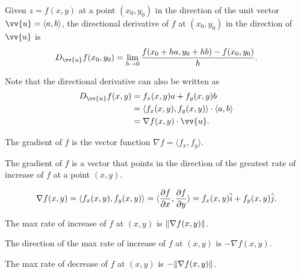 \documentclass{article}
\begin{document}
\renewcommand{\familydefault}{\rmdefault}



\setcounter{page}{0}
\newpage
\tableofcontents
\newpage



\begin{definitionbox}
    Given \( z = f(x, y) \) at a point \( (x_0, y_0) \) in the direction of the unit vector \( \vv{u} = \langle a, b \rangle \), the directional derivative of \( f \) at \( (x_0, y_0) \) in the direction of \( \vv{u} \) is
    \[ D_{\vv{u}} f(x_0, y_0) = \lim_{h \to 0} \frac{f(x_0 + ha, y_0 + hb) - f(x_0, y_0)}{h}. \]
\end{definitionbox}

\begin{notebox}
    Note that the directional derivative can also be written as
    \begin{align*}
        D_{\vv{u}} f(x, y) &= f_x(x, y) a + f_y(x, y) b \\
        &= \langle f_x(x, y), f_y(x, y) \rangle \cdot \langle a, b \rangle \\
        &= \nabla f(x, y) \cdot \vv{u}.
    \end{align*}
\end{notebox}

\begin{definitionbox}
    The gradient of \( f \) is the vector function \( \nabla f = \langle f_x, f_y \rangle \).

    \begin{conceptbox}
        The gradient of \( f \) is a vector that points in the direction of the greatest rate of increase of \( f \) at a point \( (x, y) \).

        \[ \nabla f(x, y) = \langle f_x(x, y), f_y(x, y) \rangle = \langle \pdv{f}{x}, \pdv{f}{y} \rangle = f_x(x, y) \hat{i} + f_y(x, y) \hat{j}. \]
    \end{conceptbox}
\end{definitionbox}

The max rate of increase of \( f \) at \( (x, y) \) is \( \norm{\nabla f(x, y)} \).

The direction of the max rate of increase of \( f \) at \( (x, y) \) is \( -\nabla f(x, y) \).

\begin{definitionbox}
    The max rate of decrease of \( f \) at \( (x, y) \) is \( -\norm{\nabla f(x, y)} \).
\end{definitionbox}
\end{document}
